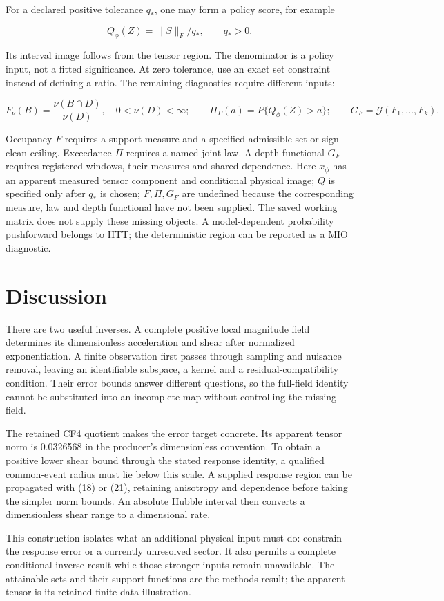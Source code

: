 \documentclass[aps,prd,reprint,onecolumn,11pt,nofootinbib,notitlepage]{revtex4-2}
\begin{document}
For a declared positive tolerance \(q_*\), one may form a policy score, for example

\begin{equation}
 Q_\phi(Z)=\|S\|_F/q_*,\qquad q_*>0 .\tag{34}
\end{equation}

Its interval image follows from the tensor region. The denominator is a policy input, not a fitted significance. At zero tolerance, use an exact set constraint instead of defining a ratio. The remaining diagnostics require different inputs:

\begin{equation}
 F_\nu(B)=\frac{\nu(B\cap D)}{\nu(D)},\quad 0<\nu(D)<\infty;
 \qquad \Pi_P(a)=P\{Q_\phi(Z)>a\};
 \qquad G_F=\mathcal G(F_1,\ldots,F_k).\tag{35}
\end{equation}

Occupancy \(F\) requires a support measure and a specified admissible set or sign-clean ceiling. Exceedance \(\Pi\) requires a named joint law. A depth functional \(G_F\) requires registered windows, their measures and shared dependence. Here \(x_\phi\) has an apparent measured tensor component and conditional physical image; \(Q\) is specified only after \(q_*\) is chosen; \(F,\Pi,G_F\) are undefined because the corresponding measure, law and depth functional have not been supplied. The saved working matrix does not supply these missing objects. A model-dependent probability pushforward belongs to HTT; the deterministic region can be reported as a MIO diagnostic.

\section{Discussion}

There are two useful inverses. A complete positive local magnitude field determines its dimensionless acceleration and shear after normalized exponentiation. A finite observation first passes through sampling and nuisance removal, leaving an identifiable subspace, a kernel and a residual-compatibility condition. Their error bounds answer different questions, so the full-field identity cannot be substituted into an incomplete map without controlling the missing field.

The retained CF4 quotient makes the error target concrete. Its apparent tensor norm is 0.0326568 in the producer's dimensionless convention. To obtain a positive lower shear bound through the stated response identity, a qualified common-event radius must lie below this scale. A supplied response region can be propagated with (18) or (21), retaining anisotropy and dependence before taking the simpler norm bounds. An absolute Hubble interval then converts a dimensionless shear range to a dimensional rate.

This construction isolates what an additional physical input must do: constrain the response error or a currently unresolved sector. It also permits a complete conditional inverse result while those stronger inputs remain unavailable. The attainable sets and their support functions are the methods result; the apparent tensor is its retained finite-data illustration.



\end{document}
